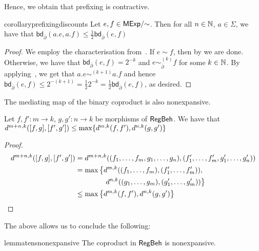 Hence, we obtain that prefixing is contractive.
\begin{restatable}{corollary}{prefixingdiscounts}\label{cor:prefixing_discounts}
	Let $e,f \in {\mathsf{MExp}}/{\sim}$. Then for all $n \in \mathbb{N}$, $a \in \Sigma$, we have that
	$
		\mathsf{bd}_{\overline{\partial}}(a.e,a.f) \leq \frac{1}{2}\mathsf{bd}_{\overline{\partial}}(e,f)
	$
\end{restatable}
\begin{proof}
	We employ the characterisation from~. If $e \sim f$, then by  we are done. Otherwise, we have that $\mathsf{bd}_{\overline\partial}(e,f)=2^{-k}$ and $e \sim^{(k)}_{\overline\partial} f$ for some $k \in \mathbb{N}$. By applying~, we get that $a.e \sim^{(k+1)} a.f$ and hence $\mathsf{bd}_{\overline\partial}(e,f)\leq 2^{-(k+1)} = \frac{1}{2} 2^{-k} = \frac{1}{2}\mathsf{bd}_{\overline\partial}(e,f)$, as desired. 
\end{proof}
The mediating map of the binary coproduct is also nonexpansive.
\begin{lemma}\label{lem:pairs_nonexpansive}
	Let $f,f' \colon m \to k$, $g,g' \colon n \to k$ be morphisms of $\mathsf{RegBeh}$. We have that $d^{m +n, k}([ f, g ], [ f', g' ]) \leq \max \{d^{m,k}(f,f'), d^{n,k}(g,g')\}$
\end{lemma}
\begin{proof}
	\begin{align*}
		d^{m +n, k}([ f, g ], [ f', g' ]) &= d^{m +n, k}((f_1, \dots, f_m, g_1, \dots, g_n), (f'_1, \dots, f'_m, g'_1, \dots, g'_n)) \\
		&=\max \left\{d^{m,k}((f_1, \dots, f_m), (f'_1, \dots, f'_m)),\right.\\&\qquad \qquad\left. d^{n,k}((g_1, \dots, g_m), (g'_1, \dots, g'_m)) \right\}\\
		&\leq \max \left\{d^{m,k}(f,f'),d^{n,k}(g,g') \right\} \tag*{\hfill\qedhere}
	\end{align*}
\end{proof}
The above allows us to conclude the following:
\begin{restatable}{lemma}{tensnonexpansive}\label{lem:tens_nonexpansive}
	The coproduct in $\mathsf{RegBeh}$ is nonexpansive.
\end{restatable}
